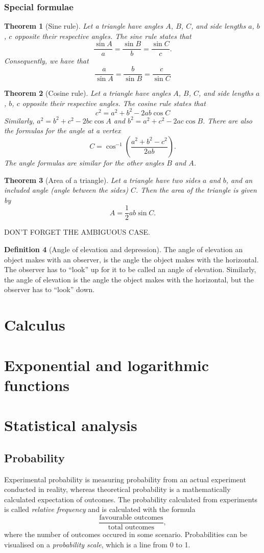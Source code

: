 \documentclass[12pt]{book}
\newtheorem{theo}{Theorem}[section]
\theoremstyle{definition}
\newtheorem{defi}[theo]{Definition}
\begin{document}
\subsection{Special formulae}
  \begin{theo}[Sine rule]
    Let a triangle have angles $A$, $B$, $C$, and side lengths $a$, $b$, $c$ opposite their respective angles. The sine rule
    states that
    \[\frac{\sin A}{a}=\frac{\sin B}{b} = \frac{\sin C}{c}.\]
    Consequently, we have that \[\frac{a}{\sin A}=\frac{b}{\sin B}=\frac{c}{\sin C}\]
  \end{theo}
  \begin{theo}[Cosine rule]
    Let a triangle have angles $A$, $B$, $C$, and side lengths $a$, $b$, $c$ opposite their respective angles. The cosine rule
    states that
    \[c^2=a^2+b^2-2ab\cos C\]
    Similarly, $a^2 = b^2+c^2-2bc\cos A$ and $b^2=a^2+c^2-2ac\cos B$. There are also the formulas for the angle at a vertex
    \[C=\cos^{-1}\left(\frac{a^2+b^2-c^2}{2ab}\right).\] The angle formulas are similar for the other angles $B$ and $A$.
  \end{theo}
  \begin{theo}[Area of a triangle]
    Let a triangle have two sides $a$ and $b$, and an included angle (angle between the sides) $C$. Then the area of the triangle
    is given by \[A=\frac{1}{2}ab\sin C.\]
  \end{theo}
  DON'T FORGET THE AMBIGUOUS CASE.
  \begin{defi}[Angle of elevation and depression]
    The angle of elevation an object makes with an observer, is the angle the object makes with the horizontal. The observer
    has to ``look'' up for it to be called an angle of elevation. Similarly, the angle of elevation is the angle the object makes
    with the horizontal, but the observer has to ``look'' down.
  \end{defi}
\chapter{Calculus}
\chapter{Exponential and logarithmic functions}
\chapter{Statistical analysis}
\section{Probability}
  Experimental probability is measuring probability from an actual experiment conducted in reality, whereas theoretical probability
  is a mathematically calculated expectation of outcomes. The probability calculated from experiments is called \textit{relative
  frequency} and is calculated with the formula
  \[\frac{\text{favourable outcomes}}{\text{total outcomes}},\] where the number of outcomes occured in some scenario. Probabilities
  can be visualised on a \textit{probability scale}, which is a line from 0 to 1.
\end{document}
